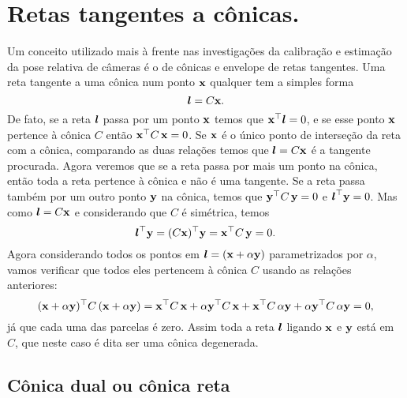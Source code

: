 \section*{Retas tangentes a cônicas.} 

Um conceito utilizado mais à frente nas investigações da calibração e estimação da pose relativa de câmeras é o de cônicas e envelope de retas tangentes. Uma reta tangente a uma cônica num ponto $\mathbf{x}$ qualquer tem a simples forma
\begin{equation*}
\boldsymbol{l}=C\mathbf{x}.
\end{equation*}
De fato, se a reta $\boldsymbol{l}$ passa por um ponto $\mathbf{x}$ temos que $\mathbf{x}^\top\boldsymbol{l}=0$, e se esse ponto $\mathbf{x}$ pertence à cônica $C$ então $\mathbf{x}^\top C\,\mathbf{x}=0$. Se $\mathbf{x}$ é o único ponto de interseção da reta com a cônica, comparando as duas relações  temos que $\boldsymbol{l}=C\mathbf{x}$ é a tangente procurada. Agora veremos que se a reta passa por mais um ponto na cônica, então toda a reta pertence à cônica e não é uma tangente.
Se a reta passa também por um outro ponto ${\bf y}$ na cônica, temos que ${\bf y}^\top C\,{\bf y}=0$ e $\boldsymbol{l}^\top{\bf y}=0$. Mas como $\boldsymbol{l}=C\mathbf{x}$ e considerando que $C$ é simétrica, temos
\begin{equation*}
\boldsymbol{l}^\top{\bf y}=(C\mathbf{x})^\top{\bf y}=\mathbf{x}^\top C\,{\bf y}=0.
\end{equation*}  
Agora considerando todos os pontos em $\boldsymbol{l}=(\mathbf{x}+\alpha{\bf y})$ parametrizados por $\alpha$, vamos verificar que todos eles pertencem à cônica $C$ usando as relações anteriores:
\begin{equation*}
(\mathbf{x}+\alpha{\bf y})^\top C\,(\mathbf{x}+\alpha{\bf y})=\mathbf{x}^\top C\,\mathbf{x}+\alpha{\bf y}^\top C\,\mathbf{x}+\mathbf{x}^\top C\,\alpha{\bf y}+\alpha{\bf y}^\top C\,\alpha{\bf y}=0,
\end{equation*}
já que cada uma das parcelas é zero. Assim toda a reta $\boldsymbol{l}$ ligando $\mathbf{x}$ e ${\bf y}$ está em $C$, que neste caso é dita ser uma cônica degenerada.
\subsection{Cônica dual ou cônica reta}\label{sec.conica-dual} 

